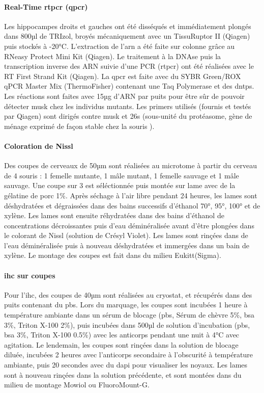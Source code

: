 \paragraph{Real-Time \acrshort{rtpcr} (\acrshort{qpcr})}
\label{par:qPCR}
	Les hippocampes droits et gauches ont été disséqués et immédiatement plongés dans 800µl de TRIzol\textregistered, broyés mécaniquement avec un TissuRuptor II (Qiagen\textregistered) puis stockés à -20°C. L'extraction de l'\acrshort{arn} a été faite sur colonne grâce au RNeasy Protect Mini Kit (Qiagen\textregistered). Le traitement à la DNAse puis la transcription inverse des ARN suivie d'une PCR (\acrshort{rtpcr}) ont été réalisées avec le RT First Strand Kit (Qiagen\textregistered). La \gls{qpcr} est faite avec du SYBR Green/ROX qPCR Master Mix (ThermoFisher\textregistered) contenant une Taq Polymerase et des \glspl{dntp}. Les réactions sont faites avec 15µg d'ARN par puits pour être sûr de pouvoir détecter \gls{musk} chez les individus mutants. Les primers utilisés (fournis et testés par Qiagen\textregistered) sont dirigés contre \gls{musk} et \acrshort{26s} (sous-unité du protéasome, gène de ménage exprimé de façon stable chez la souris \cite{Wang2017}).
	
\paragraph{Coloration de Nissl}
\label{par:Nissl}
	Des coupes de cerveaux de 50µm sont réalisées au microtome à partir du cerveau de 4 souris : 1 femelle mutante, 1 mâle mutant, 1 femelle sauvage et 1 mâle sauvage. Une coupe sur 3 est séléctionnée puis montée sur lame avec de la gélatine de porc 1\%. Après séchage à l'air libre pendant 24 heures, les lames sont déshydratées et dégraissées dans des bains successifs d'éthanol 70°, 95°, 100° et de xylène. Les lames sont ensuite réhydratées dans des bains d'éthanol de concentrations décroissantes puis d'eau déminéralisée avant d'être plongées dans le colorant de Nissl (solution de Crésyl Violet).  Les lames sont rinçées dans de l'eau déminéralisée puis à nouveau déshydratées et immergées dans un bain de xylène. Le montage des coupes est fait dans du milieu Eukitt\textregistered (Sigma).
	
\paragraph{\Acrlong{ihc} sur coupes}	
\label{par:ihccoupe}
	Pour l'\Gls{ihc}, des coupes de 40µm sont réalisées au cryostat, et récupérés dans des puits contenant du \acrshort{pbs}. Lors du marquage, les coupes sont incubées 1 heure à température ambiante dans un sérum de blocage (\acrshort{pbs}, Sérum de chèvre 5\%, \acrshort{bsa} 3\%, Triton X-100 2\%), puis  incubées dans 500µl de solution d'incubation (\acrshort{pbs}, \acrshort{bsa} 3\%, Triton X-100 0.5\%) avec les anticorps pendant une nuit à 4°C avec agitation. Le lendemain, les coupes sont rinçées dans la solution de blocage diluée, incubées 2 heures avec l'anticorps secondaire à l'obscurité à température ambiante, puis 20 secondes avec du \gls{dapi} pour visualiser les noyaux. Les lames sont à nouveau rinçées dans la solution précédente, et sont montées dans du milieu de montage Mowiol ou FluoroMount-G\textregistered.
	
